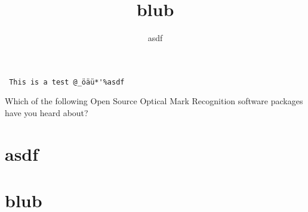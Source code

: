 \documentclass[
  english,
  pagemark,
  stamp]{sdapsclassic}
\author{asdf}
\title{blub}
\begin{document}
  \begin{questionnaire}

\begin{verbatim}
 This is a test @_öäü*'%asdf

\end{verbatim}



    \begin{choicequestion}[3]{Which of the following Open Source
                              Optical Mark Recognition software
                              packages have you heard about?}

    \end{choicequestion}


\section{asdf}


\section{blub}

  \end{questionnaire}
\end{document}
